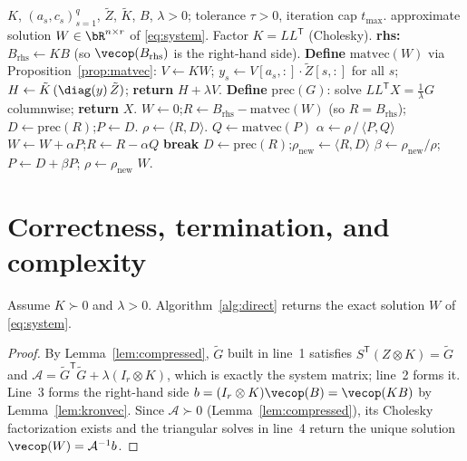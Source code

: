 \begin{algorithm}[H]
\caption{Preconditioned CG (PCG) solver for the mode-$k$ subproblem
\eqref{eq:system}}
\label{alg:pcg}
\begin{algorithmic}[1]
  \Require $K$, $(a_s,c_s)_{s=1}^q$, $\tilde Z$, $\tilde K$, $B$, $\lambda>0$;
    tolerance $\tau>0$, iteration cap $t_{\max}$.
  \Ensure approximate solution $W\in\bR^{n\times r}$ of \eqref{eq:system}.
  \State Factor $K=LL^{\mathsf T}$ (Cholesky).
  \State \textbf{rhs:} $B_{\mathrm{rhs}}\gets KB$ (so $\vecop(B_{\mathrm{rhs}})$ is the
    right-hand side).
  \Statex \textbf{Define} $\mathrm{matvec}(W)$ via Proposition~\ref{prop:matvec}:
  \Statex \quad $V\gets KW$;\;
    $y_s\gets V[a_s,:]\cdot\tilde Z[s,:]$ for all $s$;\;
    $H\gets \tilde K\,(\diag(y)\,\tilde Z)$;\;
    \textbf{return} $H+\lambda V$.
  \Statex \textbf{Define} $\mathrm{prec}(G)$: solve $LL^{\mathsf T}X=\tfrac1\lambda G$
    columnwise; \textbf{return} $X$.
  \State $W\gets 0$;\quad $R\gets B_{\mathrm{rhs}}-\mathrm{matvec}(W)$
    (so $R=B_{\mathrm{rhs}}$);\quad $D\gets \mathrm{prec}(R)$;\quad $P\gets D$.
  \State $\rho\gets \langle R,D\rangle$. 
     \State $Q\gets \mathrm{matvec}(P)$
     \State $\alpha\gets \rho\,/\,\langle P,Q\rangle$
     \State $W\gets W+\alpha P$;\quad $R\gets R-\alpha Q$
      \State \textbf{break} \EndIf
     \State $D\gets \mathrm{prec}(R)$;\quad $\rho_{\mathrm{new}}\gets\langle R,D\rangle$
     \State $\beta\gets \rho_{\mathrm{new}}/\rho$;\quad $P\gets D+\beta P$;\quad
       $\rho\gets\rho_{\mathrm{new}}$
  \EndFor
  \State \Return $W$.
\end{algorithmic}
\end{algorithm}

\section{Correctness, termination, and complexity}

\begin{theorem}\label{thm:direct}
Assume $K\succ0$ and $\lambda>0$. Algorithm~\ref{alg:direct} returns the exact solution
$W$ of \eqref{eq:system}.
\end{theorem}
\begin{proof}
By Lemma~\ref{lem:compressed}, $\tilde G$ built in line~1 satisfies
$S^{\mathsf T}(Z\otimes K)=\tilde G$ and $\mathcal A=\tilde G^{\mathsf T}\tilde G+
\lambda(I_r\otimes K)$, which is exactly the system matrix; line~2 forms it. Line~3
forms the right-hand side $b=(I_r\otimes K)\vecop(B)=\vecop(KB)$ by
Lemma~\ref{lem:kronvec}. Since $\mathcal A\succ0$ (Lemma~\ref{lem:compressed}), its
Cholesky factorization exists and the triangular solves in line~4 return the unique
solution $\vecop(W)=\mathcal A^{-1}b$.
\end{proof}


